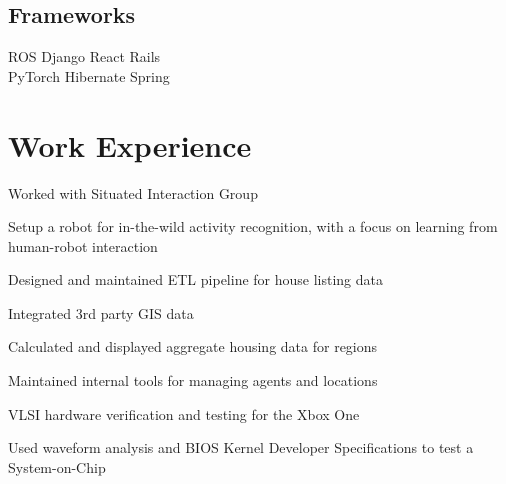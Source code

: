 \documentclass[]{deedy-resume}
\begin{document}
\begin{minipage}[t]{0.33\textwidth}
\subsection{Frameworks}
ROS \textbullet{} Django \textbullet{} React \textbullet{} Rails \\
PyTorch \textbullet{} Hibernate \textbullet{} Spring

%
%

\end{minipage}
\hfill
\begin{minipage}[t]{0.66\textwidth}


\section{Work Experience}
\vspace{0.3cm}
\begin{tightemize}
\item Worked with Situated Interaction Group
\item Setup a robot for in-the-wild activity recognition, with a focus on learning from human-robot interaction
\end{tightemize}
\sectionsep

\begin{tightemize}
\item Designed and maintained ETL pipeline for house listing data
\item Integrated 3rd party GIS data
\item Calculated and displayed aggregate housing data for regions
\item Maintained internal tools for managing agents and locations
\end{tightemize}
\sectionsep

\begin{tightemize}
\item VLSI hardware verification and testing for the Xbox One
\item Used waveform analysis and BIOS Kernel Developer Specifications to test a System-on-Chip
\end{tightemize}
\sectionsep


\end{minipage}
\end{document}

